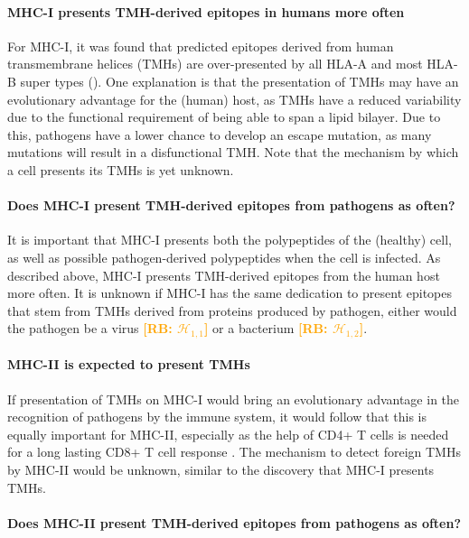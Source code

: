 \documentclass{article}
\newcommand{\richel}[1]{\textcolor{orange}{\textbf{[RB: #1]}}}
\begin{document}
\paragraph{MHC-I presents TMH-derived epitopes in humans more often}


For MHC-I, it was found that predicted epitopes derived 
from human transmembrane helices (TMHs)
are over-presented by all HLA-A and 
most HLA-B super types (\cite{bianchi2017}). 
One explanation is that the presentation of TMHs 
may have an evolutionary advantage for 
the (human) host, as TMHs have a reduced variability 
due to the functional requirement of being able to span a lipid 
bilayer. 
Due to this, pathogens have a lower chance to develop an escape mutation,
as many mutations will result in a disfunctional TMH.
Note that the mechanism by which a cell presents its TMHs is
yet unknown.

\paragraph{Does MHC-I present TMH-derived epitopes from pathogens as often?}

It is important that MHC-I presents both the polypeptides of the 
(healthy) cell, as well as possible pathogen-derived polypeptides when the
cell is infected. As described above, MHC-I presents TMH-derived epitopes 
from the human host more often. It is unknown if MHC-I has the same
dedication to present epitopes that stem from TMHs derived from
proteins produced by pathogen, either would the pathogen
be a virus \richel{$\mathcal{H}_{1,1}$} or 
a bacterium \richel{$\mathcal{H}_{1,2}$}.


\paragraph{MHC-II is expected to present TMHs}


If presentation of TMHs on MHC-I would bring an evolutionary advantage 
in the recognition of pathogens by the immune system, 
it would follow that this is equally important for MHC-II, 
especially as the help of CD4+ T cells is needed for a long lasting CD8+ T cell 
response \cite{novy2007cd4}. 
The mechanism to detect foreign TMHs by MHC-II would be unknown, 
similar to the discovery that MHC-I presents TMHs.

\paragraph{Does MHC-II present TMH-derived epitopes from pathogens as often?}
\end{document}

